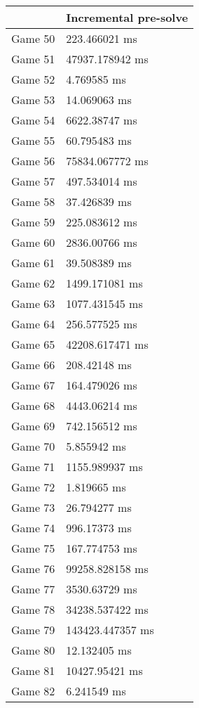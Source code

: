 \begin{tabular}{|l|l|}
	\hline
	& Incremental pre-solve \\ \hline
	Game 50 & 223.466021 ms \\ \hline
	Game 51 & 47937.178942 ms \\ \hline
	Game 52 & 4.769585 ms \\ \hline
	Game 53 & 14.069063 ms \\ \hline
	Game 54 & 6622.38747 ms \\ \hline
	Game 55 & 60.795483 ms \\ \hline
	Game 56 & 75834.067772 ms \\ \hline
	Game 57 & 497.534014 ms \\ \hline
	Game 58 & 37.426839 ms \\ \hline
	Game 59 & 225.083612 ms \\ \hline
	Game 60 & 2836.00766 ms \\ \hline
	Game 61 & 39.508389 ms \\ \hline
	Game 62 & 1499.171081 ms \\ \hline
	Game 63 & 1077.431545 ms \\ \hline
	Game 64 & 256.577525 ms \\ \hline
	Game 65 & 42208.617471 ms \\ \hline
	Game 66 & 208.42148 ms \\ \hline
	Game 67 & 164.479026 ms \\ \hline
	Game 68 & 4443.06214 ms \\ \hline
	Game 69 & 742.156512 ms \\ \hline
	Game 70 & 5.855942 ms \\ \hline
	Game 71 & 1155.989937 ms \\ \hline
	Game 72 & 1.819665 ms \\ \hline
	Game 73 & 26.794277 ms \\ \hline
	Game 74 & 996.17373 ms \\ \hline
	Game 75 & 167.774753 ms \\ \hline
	Game 76 & 99258.828158 ms \\ \hline
	Game 77 & 3530.63729 ms \\ \hline
	Game 78 & 34238.537422 ms \\ \hline
	Game 79 & 143423.447357 ms \\ \hline
	Game 80 & 12.132405 ms \\ \hline
	Game 81 & 10427.95421 ms \\ \hline
	Game 82 & 6.241549 ms \\ \hline

\end{tabular}
